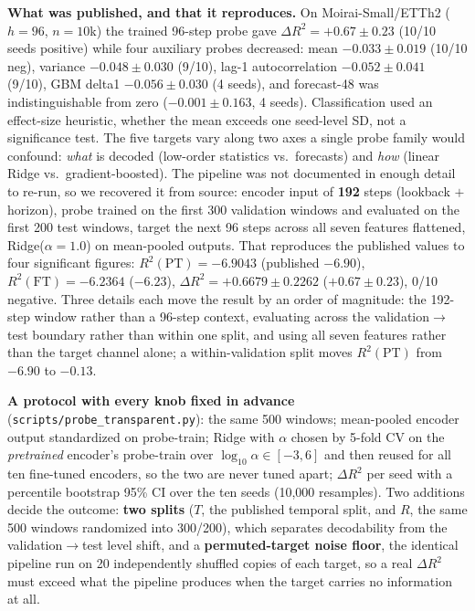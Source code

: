 \documentclass{article}
\begin{document}
\textbf{What was published, and that it reproduces.} On Moirai-Small/ETTh2 ($h{=}96$, $n{=}10$k) the
trained 96-step probe gave $\Delta R^2 = +0.67{\pm}0.23$ (10/10 seeds positive) while four auxiliary
probes decreased: mean $-0.033{\pm}0.019$ (10/10 neg), variance $-0.048{\pm}0.030$ (9/10),
lag-1 autocorrelation $-0.052{\pm}0.041$ (9/10), GBM delta1 $-0.056{\pm}0.030$ (4 seeds), and
forecast-48 was indistinguishable from zero ($-0.001{\pm}0.163$, 4 seeds). Classification used an
effect-size heuristic, whether the mean exceeds one seed-level SD, not a significance test. The five
targets vary along two axes a single probe family would confound: \emph{what} is decoded (low-order
statistics vs.\ forecasts) and \emph{how} (linear Ridge vs.\ gradient-boosted). The pipeline was not
documented in enough detail to re-run, so we recovered it from source: encoder input of \textbf{192}
steps (lookback $+$ horizon), probe trained on the first 300 validation windows and evaluated on the
first 200 test windows, target the next 96 steps across all seven features flattened,
Ridge($\alpha{=}1.0$) on mean-pooled outputs. That reproduces the published values to four
significant figures: $R^2(\text{PT}){=}-6.9043$ (published $-6.90$), $R^2(\text{FT}){=}-6.2364$
($-6.23$), $\Delta R^2{=}+0.6679{\pm}0.2262$ ($+0.67{\pm}0.23$), 0/10 negative. Three details each
move the result by an order of magnitude: the 192-step window rather than a 96-step context,
evaluating across the validation$\rightarrow$test boundary rather than within one split, and using all
seven features rather than the target channel alone; a within-validation split moves
$R^2(\text{PT})$ from $-6.90$ to $-0.13$.

\textbf{A protocol with every knob fixed in advance} (\texttt{scripts/probe\_transparent.py}): the
same 500 windows; mean-pooled encoder output standardized on probe-train; Ridge with $\alpha$ chosen
by 5-fold CV on the \emph{pretrained} encoder's probe-train over $\log_{10}\alpha \in [-3, 6]$ and
then reused for all ten fine-tuned encoders, so the two are never tuned apart; $\Delta R^2$ per seed
with a percentile bootstrap 95\% CI over the ten seeds (10{,}000 resamples). Two additions decide the
outcome: \textbf{two splits} ($T$, the published temporal split, and $R$, the same 500 windows
randomized into 300/200), which separates decodability from the validation$\rightarrow$test level
shift, and a \textbf{permuted-target noise floor}, the identical pipeline run on 20 independently
shuffled copies of each target, so a real $\Delta R^2$ must exceed what the pipeline produces when the
target carries no information at all.
\end{document}
